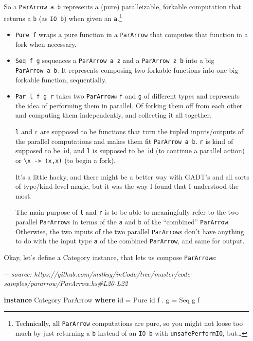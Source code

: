 \documentclass[]{article}
\newenvironment{Shaded}{}{}
\newcommand{\CommentTok}[1]{\textcolor[rgb]{0.38,0.63,0.69}{\textit{#1}}}
\newcommand{\DataTypeTok}[1]{\textcolor[rgb]{0.56,0.13,0.00}{#1}}
\newcommand{\FunctionTok}[1]{\textcolor[rgb]{0.02,0.16,0.49}{#1}}
\newcommand{\KeywordTok}[1]{\textcolor[rgb]{0.00,0.44,0.13}{\textbf{#1}}}
\newcommand{\NormalTok}[1]{#1}
\newcommand{\OperatorTok}[1]{\textcolor[rgb]{0.40,0.40,0.40}{#1}}
\newcommand{\OtherTok}[1]{\textcolor[rgb]{0.00,0.44,0.13}{#1}}
\begin{document}
So a \texttt{ParArrow\ a\ b} represents a (pure) paralleizable, forkable
computation that returns a \texttt{b} (as \texttt{IO\ b}) when given an
\texttt{a}.\footnote{Technically, all \texttt{ParArrow} computations are pure,
  so you might not loose too much by just returning a \texttt{b} instead of an
  \texttt{IO\ b} with \texttt{unsafePerformIO}, but\ldots{}}

\begin{itemize}
\item
  \texttt{Pure\ f} wraps a pure function in a \texttt{ParArrow} that computes
  that function in a fork when necessary.
\item
  \texttt{Seq\ f\ g} sequences a \texttt{ParArrow\ a\ z} and a
  \texttt{ParArrow\ z\ b} into a big \texttt{ParArrow\ a\ b}. It represents
  composing two forkable functions into one big forkable function, sequentially.
\item
  \texttt{Par\ l\ f\ g\ r} takes two \texttt{ParArrow}s \texttt{f} and
  \texttt{g} of different types and represents the idea of performing them in
  parallel. Of forking them off from each other and computing them
  independently, and collecting it all together.

  \texttt{l} and \texttt{r} are supposed to be functions that turn the tupled
  inputs/outputs of the parallel computations and makes them fit
  \texttt{ParArrow\ a\ b}. \texttt{r} is kind of supposed to be \texttt{id}, and
  \texttt{l} is supposed to be \texttt{id} (to continue a parallel action) or
  \texttt{\textbackslash{}x\ -\textgreater{}\ (x,x)} (to begin a fork).

  It's a little hacky, and there might be a better way with GADT's and all sorts
  of type/kind-level magic, but it was the way I found that I understood the
  most.

  The main purpose of \texttt{l} and \texttt{r} is to be able to meaningfully
  refer to the two parallel \texttt{ParArrow}s in terms of the \texttt{a} and
  \texttt{b} of the ``combined'' \texttt{ParArrow}. Otherwise, the two inputs of
  the two parallel \texttt{ParArrow}s don't have anything to do with the input
  type \texttt{a} of the combined \texttt{ParArrow}, and same for output.
\end{itemize}

Okay, let's define a Category instance, that lets us compose \texttt{ParArrow}s:

\begin{Shaded}
\begin{Highlighting}[]
\CommentTok{{-}{-} source: https://github.com/mstksg/inCode/tree/master/code{-}samples/pararrow/ParArrow.hs\#L20{-}L22}

\KeywordTok{instance} \DataTypeTok{Category} \DataTypeTok{ParArrow} \KeywordTok{where}
    \FunctionTok{id}    \OtherTok{=} \DataTypeTok{Pure} \FunctionTok{id}
\NormalTok{    f }\OperatorTok{.}\NormalTok{ g }\OtherTok{=} \DataTypeTok{Seq}\NormalTok{ g f}
\end{Highlighting}
\end{Shaded}
\end{document}
